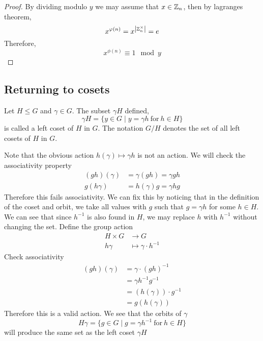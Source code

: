 \documentclass{article}
\begin{document}
\begin{proof}
    By dividing modulo $y$ we may assume that $x \in \mathbb{Z}_n$, then by lagranges theorem,
    \[
        x^{\varphi(n)} = x^{\left\lvert \mathbb{Z}_{n}^{\times}\right\rvert} = e  
    \]
    Therefore,
    \[
        x^{\phi(n)} \equiv 1 \mod y  
    \]
\end{proof}

\subsection*{Returning to cosets}
\begin{defi}
    Let $H \leq G$ and $\gamma \in G$. The subset $\gamma H$ defined,
    \[
        \gamma H = \{y \in G \mid y = \gamma h \ \text{for} \ h \in H\}
    \]
    is called a left coset of $H$ in $G$. The notation $G \slash H$ denotes the set of all left cosets of $H$ in $G$.
\end{defi}

\begin{ex}
    Note that the obvious action $h(\gamma) \mapsto \gamma  h$ is not an action. We will check the associativity property
    \begin{align*}
        (gh)(\gamma) &= \gamma (gh) = \gamma g h \\
        g(h \gamma) &= h(\gamma) g = \gamma h g
    \end{align*}
    Therefore this fails associativity. We can fix this by noticing that in the definition of the coset and orbit, we take all values with $g$ such that $g = \gamma h$ for some $h \in H$.
    We can see that since $h^{-1}$ is also found in $H$, we may replace $h$ with $h^{-1}$ without changing the set. Define the group action
    \begin{align*}
        H \times G &\rightarrow G \\
        h \gamma &\mapsto \gamma \cdot h^{-1}
    \end{align*}
    Check associativity
    \begin{align*}
        (gh)(\gamma) &= \gamma \cdot (gh)^{-1} \\
        &= \gamma h^{-1} g^{-1} \\
        &= (h(\gamma)) \cdot g^{-1} \\
        &= g(h(\gamma))
    \end{align*}
    Therefore this is a valid action. We see that the orbits of $\gamma$
    \[
        H\gamma = \{g \in G \mid g = \gamma h^{-1} \ \text{for} \ h \in H\}  
    \]
    will produce the same set as the left coset $\gamma H$
\end{ex}
\end{document}
